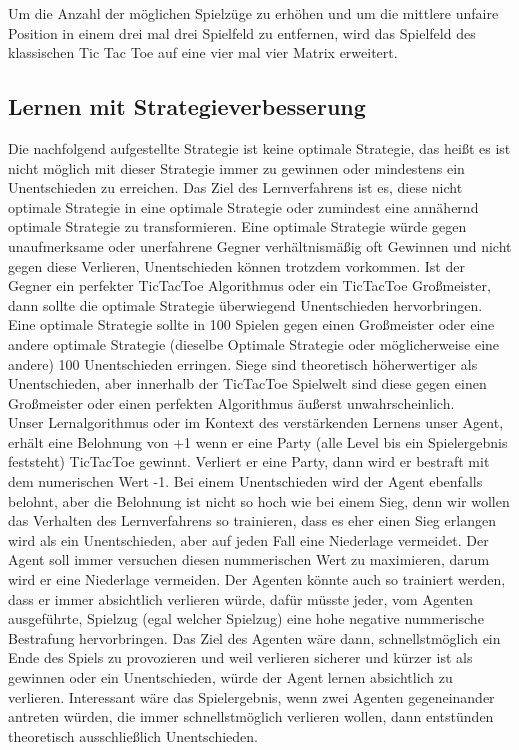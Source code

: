 Um die Anzahl der möglichen Spielzüge zu erhöhen und um die mittlere unfaire Position in einem drei mal drei Spielfeld zu entfernen, wird das Spielfeld des klassischen Tic Tac Toe auf eine vier mal vier Matrix erweitert.

\subsection{Lernen mit Strategieverbesserung}
Die nachfolgend aufgestellte Strategie ist keine optimale Strategie, das heißt es ist nicht möglich mit dieser Strategie immer zu gewinnen oder mindestens ein Unentschieden zu erreichen. Das Ziel des Lernverfahrens ist es, diese nicht optimale Strategie in eine optimale Strategie oder zumindest eine annähernd optimale Strategie zu transformieren. Eine optimale Strategie würde gegen unaufmerksame oder unerfahrene Gegner verhältnismäßig oft Gewinnen und nicht gegen diese Verlieren, Unentschieden können trotzdem vorkommen. Ist der Gegner ein perfekter TicTacToe Algorithmus oder ein TicTacToe Großmeister, dann sollte die optimale Strategie überwiegend Unentschieden hervorbringen. Eine optimale Strategie sollte in 100 Spielen gegen einen Großmeister oder eine andere optimale Strategie (dieselbe Optimale Strategie oder möglicherweise eine andere) 100 Unentschieden erringen. Siege sind theoretisch höherwertiger als Unentschieden, aber innerhalb der TicTacToe Spielwelt sind diese gegen einen Großmeister oder einen perfekten Algorithmus äußerst unwahrscheinlich. \\

Unser Lernalgorithmus oder im Kontext des verstärkenden Lernens unser Agent, erhält eine Belohnung von +1 wenn er eine Party (alle Level bis ein Spielergebnis feststeht) TicTacToe gewinnt. Verliert er eine Party, dann wird er bestraft mit dem numerischen Wert -1. Bei einem Unentschieden wird der Agent ebenfalls belohnt, aber die Belohnung ist nicht so hoch wie bei einem Sieg, denn wir wollen das Verhalten des Lernverfahrens so trainieren, dass es eher einen Sieg erlangen wird als ein Unentschieden, aber auf jeden Fall eine Niederlage vermeidet. Der Agent soll immer versuchen diesen nummerischen Wert zu maximieren, darum wird er eine Niederlage vermeiden. Der Agenten könnte auch so trainiert werden, dass er immer absichtlich verlieren würde, dafür müsste jeder, vom Agenten ausgeführte, Spielzug (egal welcher Spielzug) eine hohe negative nummerische Bestrafung hervorbringen. Das Ziel des Agenten wäre dann, schnellstmöglich ein Ende des Spiels zu provozieren und weil verlieren sicherer und kürzer ist als gewinnen oder ein Unentschieden, würde der Agent lernen absichtlich zu verlieren. Interessant wäre das Spielergebnis, wenn zwei Agenten gegeneinander antreten würden, die immer schnellstmöglich verlieren wollen, dann entstünden theoretisch ausschließlich Unentschieden.

